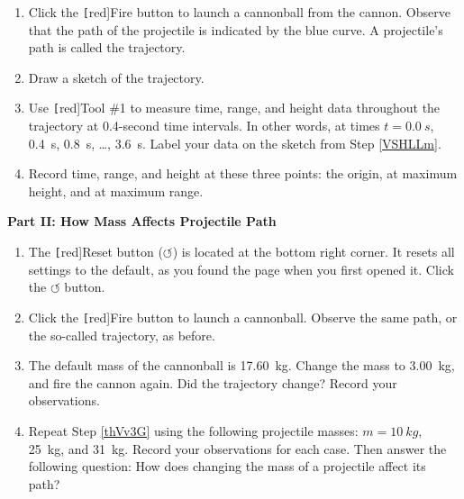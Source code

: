 \documentclass[main-physics.tex]{subfiles}
\begin{document}
\begin{enumerate}
    \item Click the \texttt[red]{Fire} button to launch a cannonball from the cannon. Observe that the path of the projectile is indicated by the blue curve. A projectile's path is called the trajectory.
    \item Draw a sketch of the trajectory. 
    \item \label{VSHLLm} Use \texttt[red]{Tool \#1} to measure time, range, and height data throughout the trajectory at 0.4-second time intervals. In other words, at times $t=\SI{0.0}{s}$, \SI{0.4}{s}, \SI{0.8}{s}, \ldots, \SI{3.6}{s}. Label your data on the sketch from Step \ref{VSHLLm}.
    \item Record time, range, and height at these three points: the origin, at maximum height, and at maximum range.
\end{enumerate}



\vspace{1em}

\textbf{Part II: How Mass Affects Projectile Path}

\begin{enumerate}
    \item The \texttt[red]{Reset} button ($\boldsymbol{\circlearrowleft}$) is located at the bottom right corner. It resets all settings to the default, as you found the page when you first opened it. Click the $\boldsymbol{\circlearrowleft}$ button.
    \item Click the \texttt[red]{Fire} button to launch a cannonball. Observe the same path, or the so-called trajectory, as before.
    \item \label{thVv3G} The default mass of the cannonball is \SI{17.60}{kg}. Change the mass to \SI{3.00}{kg}, and fire the cannon again. Did the trajectory change? Record your observations. 
    \item Repeat Step \ref{thVv3G} using the following projectile masses: $m=\SI{10}{kg}$, \SI{25}{kg}, and \SI{31}{kg}. Record your observations for each case. Then answer the following question: How does changing the mass of a projectile affect its path?
\end{enumerate}

\vspace{1em}
\end{document}
